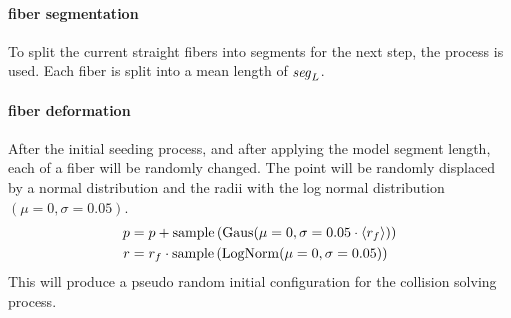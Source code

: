 \paragraph{fiber segmentation}
%
To split the current straight fibers into segments for the next step, the  process is used.
Each fiber is split into a mean length of $\textnormal{$\mathit{seg}_{L}$}$.
%
\paragraph{fiber deformation}
After the initial seeding process, and after applying the model segment length, each  of a fiber will be randomly changed.
The point will be randomly displaced by a normal distribution and the radii with the log normal distribution $(\mu=0,\sigma=0.05)$.
% 
\begin{align}
\begin{split}
p &= p + \mathrm{sample}\left(\mathrm{Gaus}(\mu=0,\sigma=0.05 \cdot \textnormal{$\langle{r_f}\rangle$})\right)\\
r &= \textnormal{$r_f$} \cdot \mathrm{sample}\left(\mathrm{LogNorm}(\mu=0,\sigma=0.05)\right)
\end{split}
\end{align}
% 
This will produce a pseudo random initial configuration for the collision solving process.
% 
